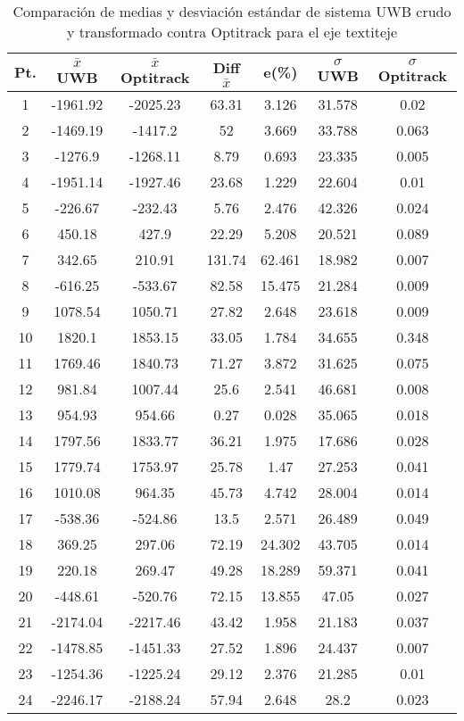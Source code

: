 \begin{table}[H]
\centering
\begin{tabular}{c c c c c c c }
\hline
Pt. & $\bar{x}$ UWB & $\bar{x}$ Optitrack & Diff $\bar{x}$ & e(\%) & $\sigma$ UWB & $\sigma$ Optitrack\\ \hline
1 & -1961.92 & -2025.23 & 63.31 & 3.126 & 31.578 & 0.02\\ 
2 & -1469.19 & -1417.2 & 52 & 3.669 & 33.788 & 0.063\\ 
3 & -1276.9 & -1268.11 & 8.79 & 0.693 & 23.335 & 0.005\\ 
4 & -1951.14 & -1927.46 & 23.68 & 1.229 & 22.604 & 0.01\\ 
5 & -226.67 & -232.43 & 5.76 & 2.476 & 42.326 & 0.024\\ 
6 & 450.18 & 427.9 & 22.29 & 5.208 & 20.521 & 0.089\\ 
7 & 342.65 & 210.91 & 131.74 & 62.461 & 18.982 & 0.007\\ 
8 & -616.25 & -533.67 & 82.58 & 15.475 & 21.284 & 0.009\\ 
9 & 1078.54 & 1050.71 & 27.82 & 2.648 & 23.618 & 0.009\\ 
10 & 1820.1 & 1853.15 & 33.05 & 1.784 & 34.655 & 0.348\\ 
11 & 1769.46 & 1840.73 & 71.27 & 3.872 & 31.625 & 0.075\\ 
12 & 981.84 & 1007.44 & 25.6 & 2.541 & 46.681 & 0.008\\ 
13 & 954.93 & 954.66 & 0.27 & 0.028 & 35.065 & 0.018\\ 
14 & 1797.56 & 1833.77 & 36.21 & 1.975 & 17.686 & 0.028\\ 
15 & 1779.74 & 1753.97 & 25.78 & 1.47 & 27.253 & 0.041\\ 
16 & 1010.08 & 964.35 & 45.73 & 4.742 & 28.004 & 0.014\\ 
17 & -538.36 & -524.86 & 13.5 & 2.571 & 26.489 & 0.049\\ 
18 & 369.25 & 297.06 & 72.19 & 24.302 & 43.705 & 0.014\\ 
19 & 220.18 & 269.47 & 49.28 & 18.289 & 59.371 & 0.041\\ 
20 & -448.61 & -520.76 & 72.15 & 13.855 & 47.05 & 0.027\\ 
21 & -2174.04 & -2217.46 & 43.42 & 1.958 & 21.183 & 0.037\\ 
22 & -1478.85 & -1451.33 & 27.52 & 1.896 & 24.437 & 0.007\\ 
23 & -1254.36 & -1225.24 & 29.12 & 2.376 & 21.285 & 0.01\\ 
24 & -2246.17 & -2188.24 & 57.94 & 2.648 & 28.2 & 0.023\\ 
\hline
\end{tabular}
\caption{Comparación de medias y desviación estándar de sistema UWB crudo y transformado contra Optitrack para el eje textit{eje}}
\end{table}
